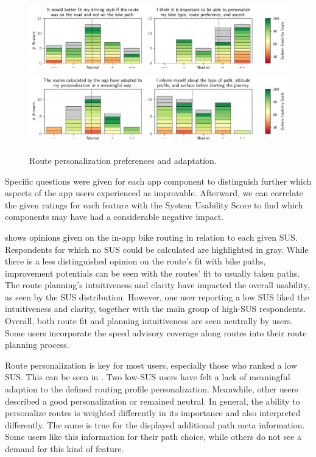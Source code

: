 \begin{figure}[t]
\caption{Route personalization preferences and adaptation.}\label{fig:route-personalization}
\includegraphics[width=\linewidth]{images/app-usability-questions-route-personalization.pdf}
\\
\includegraphics[width=\linewidth]{images/app-usability-questions-route-personalization-adaptation.pdf}
\end{figure}

Specific questions were given for each app component to distinguish further which aspects of the app users experienced as improvable. Afterward, we can correlate the given ratings for each feature with the System Usability Score to find which components may have had a considerable negative impact.

 shows opinions given on the in-app bike routing in relation to each given SUS. Respondents for which no SUS could be calculated are highlighted in gray. While there is a less distinguished opinion on the route's fit with bike paths, improvement potentials can be seen with the routes' fit to usually taken paths. The route planning's intuitiveness and clarity have impacted the overall usability, as seen by the SUS distribution. However, one user reporting a low SUS liked the intuitiveness and clarity, together with the main group of high-SUS respondents. Overall, both route fit and planning intuitiveness are seen neutrally by users. Some users incorporate the speed advisory coverage along routes into their route planning process.

Route personalization is key for most users, especially those who ranked a low SUS. This can be seen in . Two low-SUS users have felt a lack of meaningful adaption to the defined routing profile personalization. Meanwhile, other users described a good personalization or remained neutral. In general, the ability to personalize routes is weighted differently in its importance and also interpreted differently. The same is true for the displayed additional path meta information. Some users like this information for their path choice, while others do not see a demand for this kind of feature. 

